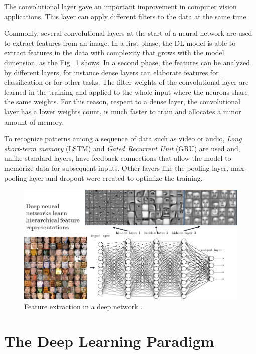 \documentclass[12pt]{report}
\begin{document}
The convolutional layer gave an important improvement in computer vision applications. This layer can apply different filters to the data at the same time.

Commonly, several convolutional layers at the start of a neural network are used to extract features from an image. 
In a first phase, the DL model is able to extract features in the data with complexity that grows with the model dimension, as the Fig.~\ref{fig:featuresextract} shows.
In a second phase, the features can be analyzed by different layers, for instance dense layers can elaborate features for classification or for other tasks.
The filter weights of the convolutional layer are learned in the training and applied to the whole input where the neurons share the same weights. 
For this reason, respect to a dense layer, the convolutional layer has a lower weights count, is much faster to train and allocates a minor amount of memory.

To recognize patterns among a sequence of data such as video or audio, \textit{Long short-term memory} (LSTM) \cite{lstm}  and \textit{Gated Recurrent Unit} (GRU) \cite{gru} are used
and, unlike standard layers, have feedback connections that allow the model to memorize data for subsequent inputs.
Other layers like the pooling layer, max-pooling layer and dropout were created to optimize the training.


\begin{figure}[t]
    \centering
    \includegraphics[scale=.5]{layers-features.png}
    \caption{Feature extraction in a deep network \cite{featuresextract}.}
    \label{fig:featuresextract}
\end{figure}


\section{The Deep Learning Paradigm}
\end{document}
